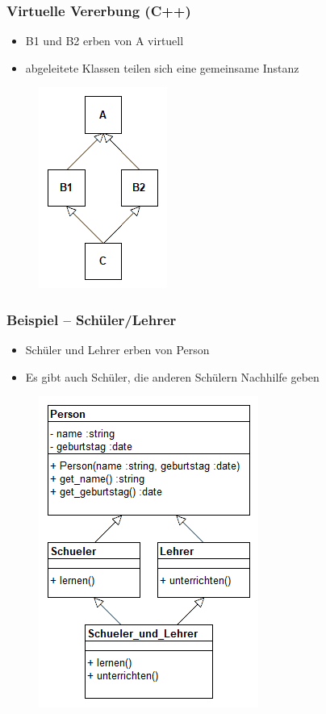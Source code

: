{
\begin{frame}
	\frametitle{Virtuelle Vererbung (C++)}
	\begin{itemize}
		\item B1 und B2 erben von A virtuell
		\item abgeleitete Klassen teilen sich eine gemeinsame Instanz
	\end{itemize}
	\begin{figure}[H]
		\includegraphics[scale=0.75]{vererbung/mehrfach/diamond/virtuell.png}
	\end{figure}
\end{frame}
}

\begin{frame}
	\frametitle{Beispiel -- Schüler/Lehrer}
	\begin{itemize}
		\item Schüler und Lehrer erben von Person
		\item Es gibt auch Schüler, die anderen Schülern Nachhilfe geben
	\end{itemize}
	\begin{figure}[H]
		\includegraphics[scale=0.5]{vererbung/mehrfach/diamond/beispiele/schueler_lehrer/schueler_lehrer.png}
	\end{figure}
\end{frame}


